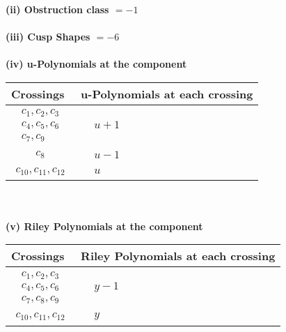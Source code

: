 \documentclass[1p]{elsarticle_modified}
\theoremstyle{definition}
\begin{document}
\flushleft \textbf{(ii) Obstruction class $= -1$}\\~\\
\flushleft \textbf{(iii) Cusp Shapes $= -6$}\\~\\
\newpage\renewcommand{\arraystretch}{1}
\flushleft \textbf{(iv) u-Polynomials at the component}\newline \\
\begin{tabular}{m{50pt}|m{274pt}}
Crossings & \hspace{64pt}u-Polynomials at each crossing \\
\hline $$\begin{aligned}c_{1},c_{2},c_{3}\\c_{4},c_{5},c_{6}\\c_{7},c_{9}\end{aligned}$$&$\begin{aligned}
&u+1
\end{aligned}$\\
\hline $$\begin{aligned}c_{8}\end{aligned}$$&$\begin{aligned}
&u-1
\end{aligned}$\\
\hline $$\begin{aligned}c_{10},c_{11},c_{12}\end{aligned}$$&$\begin{aligned}
&u
\end{aligned}$\\
\hline
\end{tabular}\\~\\
\newpage\renewcommand{\arraystretch}{1}
\flushleft \textbf{(v) Riley Polynomials at the component}\newline \\
\begin{tabular}{m{50pt}|m{274pt}}
Crossings & \hspace{64pt}Riley Polynomials at each crossing \\
\hline $$\begin{aligned}c_{1},c_{2},c_{3}\\c_{4},c_{5},c_{6}\\c_{7},c_{8},c_{9}\end{aligned}$$&$\begin{aligned}
&y-1
\end{aligned}$\\
\hline $$\begin{aligned}c_{10},c_{11},c_{12}\end{aligned}$$&$\begin{aligned}
&y
\end{aligned}$\\
\hline
\end{tabular}\\~\\
\end{document}
